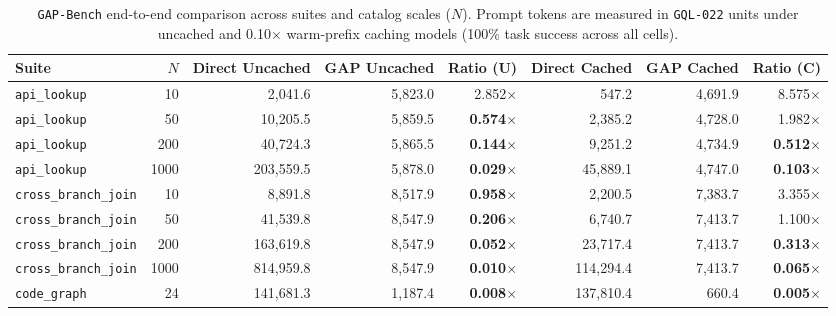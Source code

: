 \documentclass[10pt,twocolumn]{article}
\begin{document}
\begin{table}[t]
\centering
\caption{\texttt{GAP-Bench} end-to-end comparison across suites and catalog scales ($N$). Prompt tokens are measured in \texttt{GQL-022} units under uncached and 0.10$\times$ warm-prefix caching models (100\% task success across all cells).}
\label{tab:gapbench}
\scriptsize
\begin{tabular}{@{}lrrrrrrr@{}}
\toprule
Suite & $N$ & Direct Uncached & GAP Uncached & Ratio (U) & Direct Cached & GAP Cached & Ratio (C) \\
\midrule
\texttt{api\_lookup}        & 10   & 2,041.6   & 5,823.0 & 2.852$\times$ & 547.2     & 4,691.9 & 8.575$\times$ \\
\texttt{api\_lookup}        & 50   & 10,205.5  & 5,859.5 & \textbf{0.574$\times$} & 2,385.2   & 4,728.0 & 1.982$\times$ \\
\texttt{api\_lookup}        & 200  & 40,724.3  & 5,865.5 & \textbf{0.144$\times$} & 9,251.2   & 4,734.9 & \textbf{0.512$\times$} \\
\texttt{api\_lookup}        & 1000 & 203,559.5 & 5,878.0 & \textbf{0.029$\times$} & 45,889.1  & 4,747.0 & \textbf{0.103$\times$} \\
\midrule
\texttt{cross\_branch\_join} & 10  & 8,891.8   & 8,517.9 & \textbf{0.958$\times$} & 2,200.5   & 7,383.7 & 3.355$\times$ \\
\texttt{cross\_branch\_join} & 50  & 41,539.8  & 8,547.9 & \textbf{0.206$\times$} & 6,740.7   & 7,413.7 & 1.100$\times$ \\
\texttt{cross\_branch\_join} & 200 & 163,619.8 & 8,547.9 & \textbf{0.052$\times$} & 23,717.4  & 7,413.7 & \textbf{0.313$\times$} \\
\texttt{cross\_branch\_join} & 1000& 814,959.8 & 8,547.9 & \textbf{0.010$\times$} & 114,294.4 & 7,413.7 & \textbf{0.065$\times$} \\
\midrule
\texttt{code\_graph}         & 24  & 141,681.3 & 1,187.4 & \textbf{0.008$\times$} & 137,810.4 & 660.4   & \textbf{0.005$\times$} \\
\bottomrule
\end{tabular}
\end{table}
\end{document}
